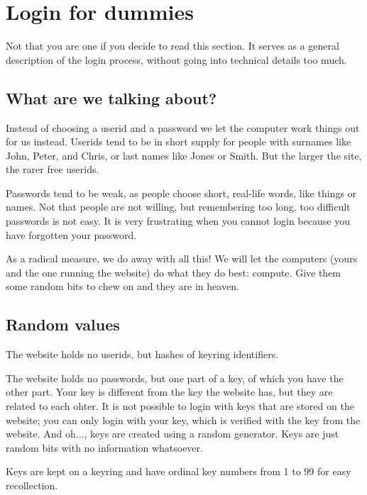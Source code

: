 \section{Login for dummies}
Not that you are one if you decide to read this section.
It serves as a general description of the login process,
without going into technical details too much.

\subsection{What are we talking about?}
Instead of choosing a userid and a password we let the computer work things out for us instead.
Userids tend to be in short supply for people with surnames like John, Peter, and Chris,
or last names like Jones or Smith.
But the larger the site, the rarer free userids.
\par
Passwords tend to be weak,
as people choose short, real-life words, like things or names.
Not that people are not willing, but remembering too long, too difficult passwords is not easy.
It is very frustrating when you cannot login because you have forgotten your password.
\par
As a radical measure, we do away with all this!
We will let the computers
(yours and the one running the website)
do what they do best: compute.
Give them some random bits to chew on and they are in heaven.
\subsection{Random values}
The website holds no userids, but hashes of keyring identifiers.
\par
The website holds no passwords, but one part of a key, of which you have the other part.
Your key is different from the key the website has, but they are related to each ohter.
It is not possible to login with keys that are stored on the website;
you can only login with your key, which is verified with the key from the website.
And oh..., keys are created using a random generator.
Keys are just random bits with no information whatsoever.
\par
Keys are kept on a keyring and have ordinal key numbers from 1 to 99 for easy recollection.
